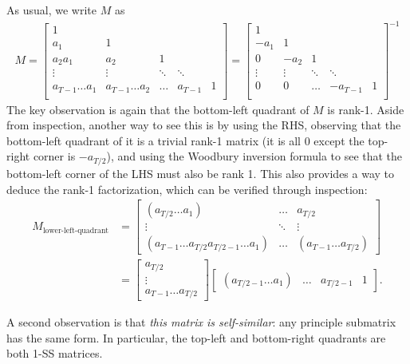 As usual, we write $M$ as
\begin{align*}%
  M =
  \begin{bmatrix}
    1 & \\
    a_1 & 1 & \\
    a_2a_1 & a_2 & 1 \\
    \vdots & \vdots & \ddots & \ddots \\
    a_{T-1}\dots a_1 & a_{T-1}\dots a_2 & \dots & a_{T-1} & 1 \\
  \end{bmatrix}
  =
  \begin{bmatrix}
    1 & \\
    -a_1 & 1 & \\
    0 & -a_2 & 1 \\
    \vdots & \vdots & \ddots & \ddots \\
    0 & 0 & \dots & -a_{T-1} & 1 \\
  \end{bmatrix}^{-1}
\end{align*}
The key observation is again that the bottom-left quadrant of $M$ is rank-1.
Aside from inspection, another way to see this is by using the RHS, observing that the bottom-left quadrant of it is a trivial rank-1 matrix (it is all 0 except the top-right corner is $-a_{T/2}$),
and using the Woodbury inversion formula to see that the bottom-left corner of the LHS must also be rank 1.
This also provides a way to deduce the rank-1 factorization,
which can be verified through inspection:
\begin{align*}%
  M_{\text{lower-left-quadrant}}
  &=
  \begin{bmatrix}
    (a_{T/2} \dots a_1) & \dots & a_{T/2} \\
    \vdots & \ddots & \vdots \\
    (a_{T-1} \dots a_{T/2} a_{T/2-1} \dots a_1) & \dots & (a_{T-1} \dots a_{T/2})
  \end{bmatrix}
  \\
  &=
  \begin{bmatrix}
    a_{T/2} \\ \vdots \\ a_{T-1} \dots a_{T/2}
  \end{bmatrix}
  \begin{bmatrix}
    (a_{T/2-1} \dots a_1) & \dots & a_{T/2-1} & 1
  \end{bmatrix}
  .
\end{align*}

A second observation is that \emph{this matrix is self-similar}: any principle submatrix has the same form.
In particular, the top-left and bottom-right quadrants are both 1-SS matrices.

